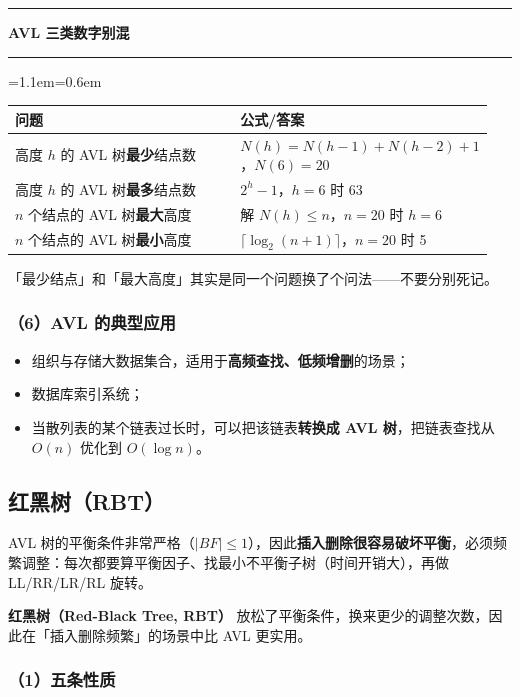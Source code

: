 \documentclass[11pt,openany,UTF8]{ctexbook}
\newcommand{\callouthead}[2]{%
  \par\addvspace{7pt}\noindent
  {\color{#1}\rule[-0.15em]{3pt}{1.05em}}\hspace{0.5em}%
  {\bfseries\color{#1}#2}\par\nobreak\vspace{-0.35em}%
  {\color{rulesep}\hrule height 0.4pt}\nobreak\vspace{0.45em}%
  \begingroup\small\setlength{\parindent}{0pt}%
  \leftskip=1.1em\rightskip=0.6em\noindent\ignorespaces}
\newcommand{\calloutend}{\par\endgroup\addvspace{7pt}}
\newenvironment{callwarn}[1]{\callouthead{warnbar}{#1}}{\calloutend}
\begin{document}
\begin{callwarn}{AVL 三类数字别混}
\begingroup\small\setlength{\tabcolsep}{4.0pt}
\begin{longtable}{@{}L{0.6304\linewidth}L{0.3152\linewidth}@{}}
\toprule
\textbf{问题} & \textbf{公式/答案} \\
\midrule
\endhead
高度 $h$ 的 AVL 树\textbf{最少}结点数 & $N(h)=N(h-1)+N(h-2)+1$，$N(6)=20$ \\
高度 $h$ 的 AVL 树\textbf{最多}结点数 & $2^h-1$，$h=6$ 时 63 \\
$n$ 个结点的 AVL 树\textbf{最大}高度 & 解 $N(h)\le n$，$n=20$ 时 $h=6$ \\
$n$ 个结点的 AVL 树\textbf{最小}高度 & $\lceil\log_2(n+1)\rceil$，$n=20$ 时 5 \\
\bottomrule
\end{longtable}
\endgroup

「最少结点」和「最大高度」其实是同一个问题换了个问法——不要分别死记。

\end{callwarn}

\subsubsection{（6）AVL 的典型应用}

\begin{itemize}
\item 组织与存储大数据集合，适用于\textbf{高频查找、低频增删}的场景；
\item 数据库索引系统；
\item 当散列表的某个链表过长时，可以把该链表\textbf{转换成 AVL 树}，把链表查找从 $O(n)$ 优化到 $O(\log n)$。
\end{itemize}
\subsection{红黑树（RBT）}

AVL 树的平衡条件非常严格（$|BF|\le 1$），因此\textbf{插入删除很容易破坏平衡}，必须频繁调整：每次都要算平衡因子、找最小不平衡子树（时间开销大），再做 LL/RR/LR/RL 旋转。

\textbf{红黑树（Red-Black Tree, RBT）} 放松了平衡条件，换来更少的调整次数，因此在「插入删除频繁」的场景中比 AVL 更实用。

\subsubsection{（1）五条性质}
\end{document}
